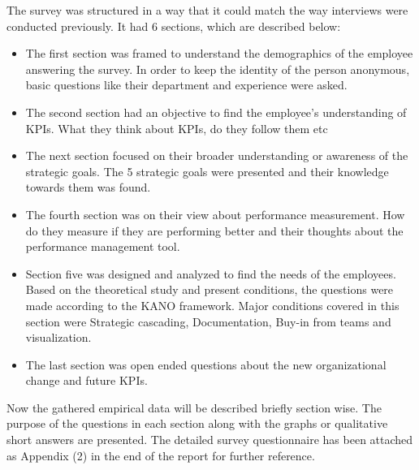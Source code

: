 The survey was structured in a way that it could match the way interviews were conducted previously. It had 6 sections, which are described below:\\

\begin{itemize}
    \item The first section was framed to understand the demographics of the employee answering the survey. In order to keep the identity of the person anonymous, basic questions like their department and experience were asked.  
    \item The second section had an objective to find the employee's understanding of KPIs. What they think about KPIs, do they follow them etc 
    \item The next section focused on their broader understanding or awareness of the strategic goals. The 5 strategic goals were presented and their knowledge towards them was found.
    \item The fourth section was on their view about performance measurement. How do they measure if they are performing better and their thoughts about the performance management tool.
    \item Section five was designed and analyzed to find the needs of the employees. Based on the theoretical study and present conditions, the questions were made according to the  KANO framework. Major conditions covered in this section were Strategic cascading, Documentation, Buy-in from teams and visualization.
    \item The last section was open ended questions about the new organizational change and future KPIs.
\end{itemize}
Now the gathered empirical data will be described briefly section wise. The purpose of the questions in each section along with the graphs or qualitative short answers are presented. The detailed survey questionnaire has been attached as Appendix (2) in the end of the report for further reference.\\

